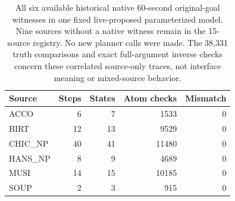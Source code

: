 \begin{table}[t]
\centering
\small
\begin{tabular}{lrrrr}
\toprule
Source & Steps & States & Atom checks & Mismatch \\
\midrule
ACCO & 6 & 7 & 1533 & 0 \\
BIRT & 12 & 13 & 9529 & 0 \\
CHIC\_NP & 40 & 41 & 11480 & 0 \\
HANS\_NP & 8 & 9 & 4689 & 0 \\
MUSI & 14 & 15 & 10185 & 0 \\
SOUP & 2 & 3 & 915 & 0 \\
\bottomrule
\end{tabular}
\caption{All six available historical native 60-second original-goal witnesses in one fixed live-proposed parameterized model. Nine sources without a native witness remain in the 15-source registry. No new planner calls were made. The 38,331 truth comparisons and exact full-argument inverse checks concern these correlated source-only traces, not interface meaning or mixed-source behavior.}
\label{tab:live-model-replay-oct23}
\end{table}
